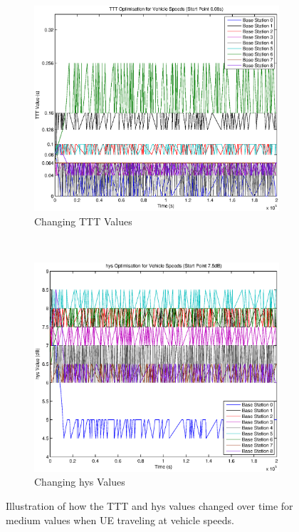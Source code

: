 \begin{figure}[H]
        \centering
        \begin{subfigure}[b]{0.49\textwidth}
                \includegraphics[width=\textwidth]{figures/vehicle_figures/highhys/long_ttt.eps}
                \caption{Changing TTT Values}
                \label{fig:veh_highhys_ttt}
        \end{subfigure}%
        ~ %
        \begin{subfigure}[b]{0.49\textwidth}
                \includegraphics[width=\textwidth]{figures/vehicle_figures/highhys/long_hys.eps}
                \caption{Changing hys Values}
                \label{fig:veh_highhys_hys}
        \end{subfigure}
        \caption{Illustration of how the TTT and hys values changed over time for medium values when UE traveling at vehicle speeds.}\label{fig:veh_highhys_ttthys}
\end{figure}